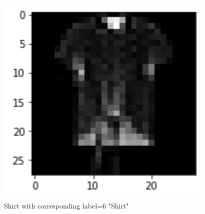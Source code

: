 \begin{figure}[!h]
    \centering
    \includegraphics{label6.png}
    \caption{Shirt with corresponding label=6 "Shirt"}
    \label{fig:my_label}
\end{figure}






